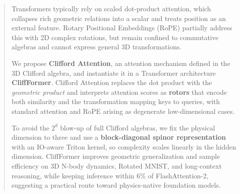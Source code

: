 \documentclass{article}
\theoremstyle{plain}
\theoremstyle{definition}
\theoremstyle{remark}
\begin{document}

\printAffiliationsAndNotice{\icmlEqualContribution}

\begin{abstract}
Transformers typically rely on scaled dot-product attention, which collapses rich geometric relations into a scalar and treats position as an external feature. Rotary Positional Embeddings (RoPE) partially address this with 2D complex rotations, but remain confined to commutative algebras and cannot express general 3D transformations.

We propose \textbf{Clifford Attention}, an attention mechanism defined in the 3D Clifford algebra, and instantiate it in a Transformer architecture \textbf{CliffFormer}. Clifford Attention replaces the dot product with the \emph{geometric product} and interprets attention scores as \textbf{rotors} that encode both similarity and the transformation mapping keys to queries, with standard attention and RoPE arising as degenerate low-dimensional cases.

To avoid the $2^d$ blow-up of full Clifford algebras, we fix the physical dimension to three and use a \textbf{block-diagonal spinor representation} with an IO-aware Triton kernel, so complexity scales linearly in the hidden dimension. CliffFormer improves geometric generalization and sample efficiency on 3D N-body dynamics, Rotated MNIST, and long-context reasoning, while keeping inference within $6\%$ of FlashAttention-2, suggesting a practical route toward physics-native foundation models.
\end{abstract}
\end{document}
